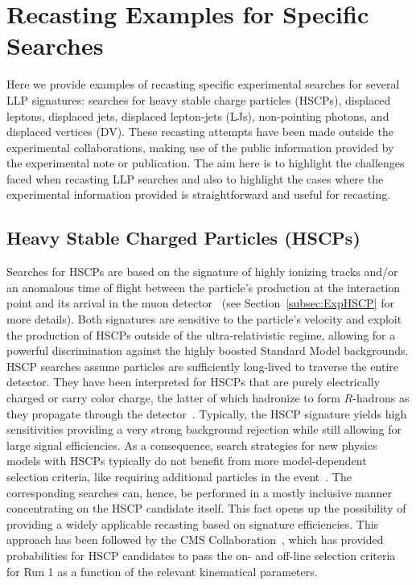 \section{Recasting Examples for Specific Searches}
\label{sec:ch5-recastExamples}

Here we provide examples of recasting specific experimental
searches for several LLP signatures: searches for heavy stable charge particles (HSCPs), displaced
leptons, displaced jets, displaced lepton-jets (LJs), non-pointing photons, and displaced vertices (DV).
These recasting attempts have been made outside the experimental collaborations,
making use of the public information provided by the experimental note or
publication. The aim here is to highlight the challenges faced when recasting
LLP searches and also to highlight the cases where the
experimental information provided is straightforward and useful for
recasting.

\subsection{Heavy Stable Charged Particles (HSCPs)}
\label{sec:ch5-HSCPs}

\renewcommand{\vec}[1]{\boldsymbol{#1}}
%

Searches for HSCPs are based on the signature
of highly ionizing tracks and/or an anomalous time of flight between 
the particle's production at the interaction point and its arrival in the
muon detector~\cite{Fairbairn:2006gg} (see Section~\ref{subsec:ExpHSCP} for more details).
Both signatures are sensitive to the particle's velocity and exploit the
production of HSCPs outside of the ultra-relativistic regime,
allowing for a powerful discrimination against the highly boosted Standard Model backgrounds.
HSCP searches assume particles are sufficiently long-lived to traverse
the entire detector.
They have been interpreted for HSCPs that are 
purely electrically charged or carry color charge, the latter of which hadronize to form
$R$-hadrons as they propagate through the detector~\cite{Farrar:1978xj}.
Typically, the HSCP signature yields high sensitivities providing
a very strong background rejection while still allowing for large
signal efficiencies.
As a consequence, search strategies for new physics models with HSCPs
typically do not benefit from more model-dependent selection criteria, like requiring additional
particles in the event~\cite{Heisig:2012zq}. The corresponding searches can, hence, be
performed in a mostly inclusive manner concentrating on the HSCP candidate itself.
This fact opens up the possibility of providing a widely applicable recasting based on signature
efficiencies. This approach has been followed by the CMS
Collaboration~\cite{Khachatryan:2015lla},
which has provided probabilities for HSCP candidates to pass the on- and
off-line selection criteria for Run 1 as a function of the relevant kinematical parameters.

